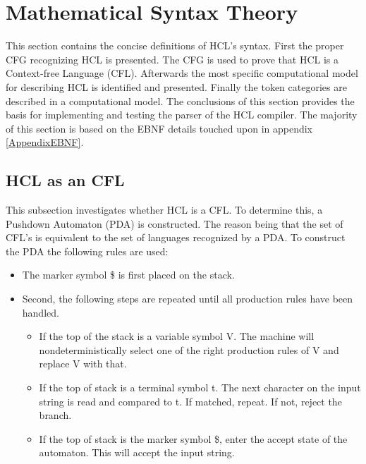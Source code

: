 \section{Mathematical Syntax Theory}
This section contains the concise definitions of HCL's syntax.
First the proper CFG recognizing HCL is presented.
The CFG is used to prove that HCL is a Context-free Language (CFL). 
Afterwards the most specific computational model for describing HCL is identified and presented. 
Finally the token categories are described in a computational model. 
The conclusions of this section provides the basis for implementing and testing the parser of the HCL compiler. 
The majority of this section is based on the EBNF details touched upon in appendix \ref{AppendixEBNF}.

\subsection{HCL as an CFL}
This subsection investigates whether HCL is a CFL. 
To determine this, a Pushdown Automaton (PDA) is constructed.
The reason being that the set of CFL's is equivalent to the set of languages recognized by a PDA.
To construct the PDA the following rules are used:
\begin{center}
	\begin{itemize}
		\item The marker symbol \$ is first placed on the stack.
		\item Second, the following steps are repeated until all production rules have been handled.
		\begin{itemize}
			\item If the top of the stack is a variable symbol V. 
			The machine will nondeterministically select one of the right production rules of V and replace V with that.   
			\item If the top of stack is a terminal symbol t. 
			The next character on the input string is read and compared to t. 
			If matched, repeat. 
			If not, reject the branch.
			\item If the top of stack is the marker symbol \$, enter the accept state of the automaton. 
			This will accept the input string.
		\end{itemize}
	\end{itemize}
\end{center}

